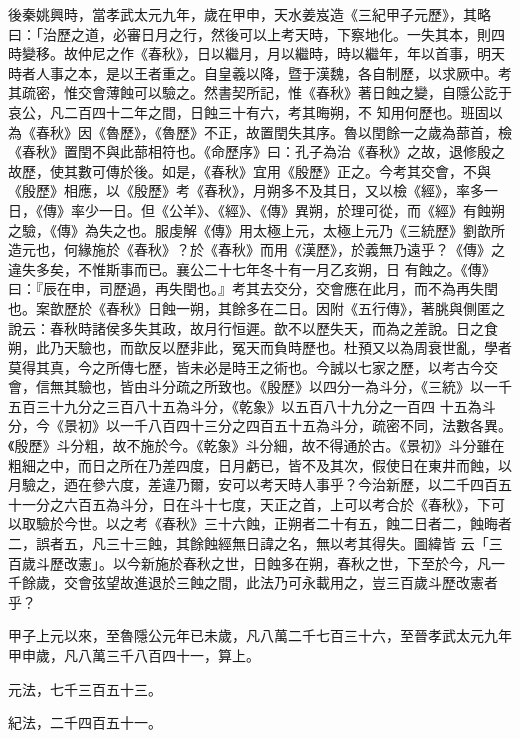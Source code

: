 \begin{pinyinscope}
 後秦姚興時，當孝武太元九年，歲在甲申，天水姜岌造《三紀甲子元歷》，其略曰：「治歷之道，必審日月之行，然後可以上考天時，下察地化。一失其本，則四時變移。故仲尼之作《春秋》，日以繼月，月以繼時，時以繼年，年以首事，明天時者人事之本，是以王者重之。自皇羲以降，暨于漢魏，各自制歷，以求厥中。考其疏密，惟交會薄蝕可以驗之。然書契所記，惟《春秋》著日蝕之變，自隱公訖于哀公，凡二百四十二年之間，日蝕三十有六，考其晦朔，不
 知用何歷也。班固以為《春秋》因《魯歷》，《魯歷》不正，故置閏失其序。魯以閏餘一之歲為蔀首，檢《春秋》置閏不與此蔀相符也。《命歷序》曰：孔子為治《春秋》之故，退修殷之故歷，使其數可傳於後。如是，《春秋》宜用《殷歷》正之。今考其交會，不與《殷歷》相應，以《殷歷》考《春秋》，月朔多不及其日，又以檢《經》，率多一日，《傳》率少一日。但《公羊》、《經》、《傳》異朔，於理可從，而《經》有蝕朔之驗，《傳》為失之也。服虔解《傳》用太極上元，太極上元乃《三統歷》劉歆所造元也，何緣施於《春秋》？於《春秋》而用《漢歷》，於義無乃遠乎？《傳》之違失多矣，不惟斯事而已。襄公二十七年冬十有一月乙亥朔，日
 有蝕之。《傳》曰：『辰在申，司歷過，再失閏也。』考其去交分，交會應在此月，而不為再失閏也。案歆歷於《春秋》日蝕一朔，其餘多在二日。因附《五行傳》，著朓與側匿之說云：春秋時諸侯多失其政，故月行恒遲。歆不以歷失天，而為之差說。日之食朔，此乃天驗也，而歆反以歷非此，冤天而負時歷也。杜預又以為周衰世亂，學者莫得其真，今之所傳七歷，皆未必是時王之術也。今誠以七家之歷，以考古今交會，信無其驗也，皆由斗分疏之所致也。《殷歷》以四分一為斗分，《三統》以一千五百三十九分之三百八十五為斗分，《乾象》以五百八十九分之一百四
 十五為斗分，今《景初》以一千八百四十三分之四百五十五為斗分，疏密不同，法數各異。《殷歷》斗分粗，故不施於今。《乾象》斗分細，故不得通於古。《景初》斗分雖在粗細之中，而日之所在乃差四度，日月虧已，皆不及其次，假使日在東井而蝕，以月驗之，迺在參六度，差違乃爾，安可以考天時人事乎？今治新歷，以二千四百五十一分之六百五為斗分，日在斗十七度，天正之首，上可以考合於《春秋》，下可以取驗於今世。以之考《春秋》三十六蝕，正朔者二十有五，蝕二日者二，蝕晦者二，誤者五，凡三十三蝕，其餘蝕經無日諱之名，無以考其得失。圖緯皆
 云「三百歲斗歷改憲」。以今新施於春秋之世，日蝕多在朔，春秋之世，下至於今，凡一千餘歲，交會弦望故進退於三蝕之間，此法乃可永載用之，豈三百歲斗歷改憲者乎？



 甲子上元以來，至魯隱公元年已未歲，凡八萬二千七百三十六，至晉孝武太元九年甲申歲，凡八萬三千八百四十一，算上。



 元法，七千三百五十三。



 紀法，二千四百五十一。




\end{pinyinscope}
